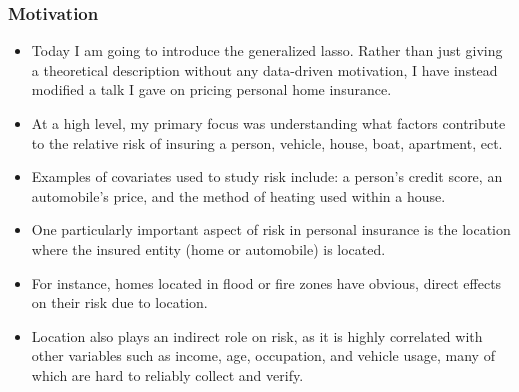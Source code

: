 \begin{frame}
  \frametitle{Motivation}
  \footnotesize

  \begin{itemize}
  \item Today I am going to introduce the generalized lasso. Rather than just giving a
      theoretical description without any data-driven motivation, I have instead
      modified a talk I gave on pricing personal home insurance. \pause
  \item At a high level, my primary focus was understanding what factors contribute
      to the relative risk of insuring a person, vehicle, house, boat, apartment, ect. \pause
  \item Examples of covariates
    used to study risk include: a person's credit score, an automobile's price,
    and the method of heating used within a house. \pause
  \item One particularly important aspect of risk in personal insurance is the location
    where the insured entity (home or automobile) is located. \pause
  \item For instance, homes located in flood or fire zones have obvious, direct
      effects on their risk due to location.\pause
  \item Location also plays an indirect role on risk, as it is highly correlated with
    other variables such as income, age, occupation, and vehicle usage, many of which
    are hard to reliably collect and verify.
  \end{itemize}

\end{frame}

